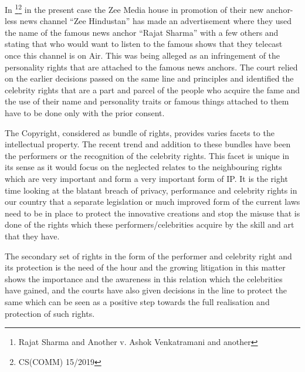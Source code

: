 \begin{multicols}{2}
\noi
In \footnote{Rajat Sharma and Another v. Ashok Venkatramani and another}\footnote{CS(COMM) 15/2019} in the present case the
Zee Media house in promotion of their new anchor-less news channel “Zee Hindustan” has
made an advertisement where they used the name of the famous news anchor “Rajat Sharma”
with a few others and stating that who would want to listen to the famous shows that they
telecast once this channel is on Air. This was being alleged as an infringement of the
personality rights that are attached to the famous news anchors. The court relied on the earlier
decisions passed on the same line and principles and identified the celebrity rights that are a
part and parcel of the people who acquire the fame and the use of their name and personality
traits or famous things attached to them have to be done only with the prior consent. 


\noi
The Copyright, considered as bundle of rights, provides varies facets to the intellectual
property. The recent trend and addition to these bundles have been the performers or the
recognition of the celebrity rights. This facet is unique in its sense as it would focus on the
neglected relates to the neighbouring rights which are very important and form a very
important form of IP. It is the right time looking at the blatant breach of privacy, performance
and celebrity rights in our country that a separate legislation or much improved form of the
current laws need to be in place to protect the innovative creations and stop the misuse that is
done of the rights which these performers/celebrities acquire by the skill and art that they
have.

\noi
The secondary set of rights in the form of the performer and celebrity right and its protection
is the need of the hour and the growing litigation in this matter shows the importance and the awareness in this relation which the celebrities have gained, and the courts have also given
decisions in the line to protect the same which can be seen as a positive step towards the full
realisation and protection of such rights.

\end{multicols}
